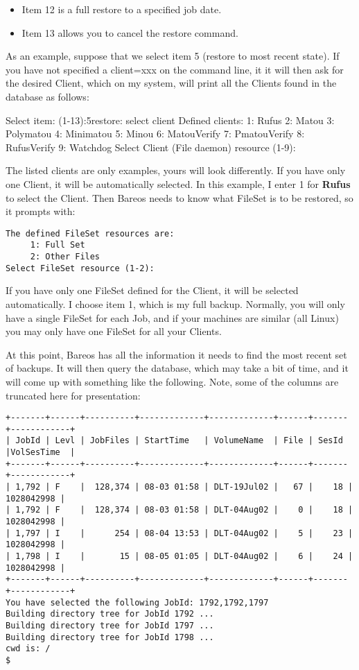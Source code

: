 \begin{itemize}
\item Item 12 is a full restore to a specified job date.

\item Item 13 allows you to cancel the restore command.
\end{itemize}

As an example, suppose that we select item 5 (restore to most recent state).
If you have not specified a client=xxx on the command line, it
it will then ask for the desired Client, which on my system, will print all
the Clients found in the database as follows:

\begin{bconsole}{Select item:  (1-13):}{5}{restore: select client}{}
Defined clients:
     1: Rufus
     2: Matou
     3: Polymatou
     4: Minimatou
     5: Minou
     6: MatouVerify
     7: PmatouVerify
     8: RufusVerify
     9: Watchdog
Select Client (File daemon) resource (1-9):
\end{bconsole}

The listed clients are only examples, yours will look differently.
If you have only one Client, it will be automatically selected.
In this example, I enter 1 for
{\bf Rufus} to select the Client.
Then Bareos needs to know what FileSet is
to be restored, so it prompts with:

\footnotesize
\begin{verbatim}
The defined FileSet resources are:
     1: Full Set
     2: Other Files
Select FileSet resource (1-2):
\end{verbatim}
\normalsize

If you have only one FileSet defined for the Client, it will be selected
automatically.  I choose item 1, which is my full backup.  Normally, you
will only have a single FileSet for each Job, and if your machines are
similar (all Linux) you may only have one FileSet for all your Clients.

At this point, Bareos has all the information it needs to find the most
recent set of backups. It will then query the database, which may take a bit
of time, and it will come up with something like the following. Note, some of
the columns are truncated here for presentation:

\footnotesize
\begin{verbatim}
+-------+------+----------+-------------+-------------+------+-------+------------+
| JobId | Levl | JobFiles | StartTime   | VolumeName  | File | SesId |VolSesTime  |
+-------+------+----------+-------------+-------------+------+-------+------------+
| 1,792 | F    |  128,374 | 08-03 01:58 | DLT-19Jul02 |   67 |    18 | 1028042998 |
| 1,792 | F    |  128,374 | 08-03 01:58 | DLT-04Aug02 |    0 |    18 | 1028042998 |
| 1,797 | I    |      254 | 08-04 13:53 | DLT-04Aug02 |    5 |    23 | 1028042998 |
| 1,798 | I    |       15 | 08-05 01:05 | DLT-04Aug02 |    6 |    24 | 1028042998 |
+-------+------+----------+-------------+-------------+------+-------+------------+
You have selected the following JobId: 1792,1792,1797
Building directory tree for JobId 1792 ...
Building directory tree for JobId 1797 ...
Building directory tree for JobId 1798 ...
cwd is: /
$
\end{verbatim}
\normalsize

